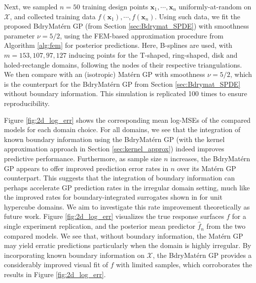 \documentclass[aos,preprint]{imsart}
\theoremstyle{plain}
\newcommand{\CalX}{\mathcal X}
\newcommand{\Bx}{\bold x}
\theoremstyle{remark}
\begin{document}

Next, we sampled $n=50$ training design points $\mathbf{x}_1, \cdots, \mathbf{x}_n$ uniformly-at-random on $\mathcal{X}$, and collected training data $f(\mathbf{x}_1), \cdots, f(\mathbf{x}_n)$. Using such data, we fit the proposed BdryMat\'ern GP (from Section \ref{sec:Bdrymat_SPDE}) with smoothness parameter $\nu = 5/2$, using the FEM-based approximation procedure from Algorithm \ref{alg:fem} for posterior predictions. Here, B-splines are used, with $m = 153, 107, 97, 127$ inducing points for the T-shaped, ring-shaped, disk and holed-rectangle domains, following the nodes of their respective triangulations. We then compare with an (isotropic) Mat\'ern GP with smoothness $\nu = 5/2$, which is the counterpart for the BdryMat\'ern GP from Section \ref{sec:Bdrymat_SPDE} without boundary information. This simulation is replicated 100 times to ensure reproducibility.


Figure \ref{fig:2d_log_err} shows the corresponding mean log-MSEs of the compared models for each domain choice. For all domains, we see that the integration of known boundary information using the BdryMat\'ern GP (with the kernel approximation approach in Section \ref{sec:kernel_approx}) indeed improves predictive performance. Furthermore, as sample size $n$ increases, the BdryMat\'ern GP appears to offer improved prediction error rates in $n$ over its Mat\'ern GP counterpart. This suggests that the integration of boundary information can perhaps accelerate GP prediction rates in the irregular domain setting, much like the improved rates for boundary-integrated surrogates shown in \cite{ding2019bdrygp} for unit hypercube domains. We aim to investigate this rate improvement theoretically as future work. Figure \ref{fig:2d_log_err} visualizes the true response surfaces $f$ for a single experiment replication, and the posterior mean predictor $\hat{f}_n$ from the two compared models. We see that, without boundary information, the Mat\'ern GP may yield erratic predictions particularly when the domain is highly irregular. By incorporating known boundary information on $\mathcal{X}$, the BdryMat\'ern GP provides a considerably improved visual fit of $f$ with limited samples, which corroborates the results in Figure \ref{fig:2d_log_err}.
\end{document}
